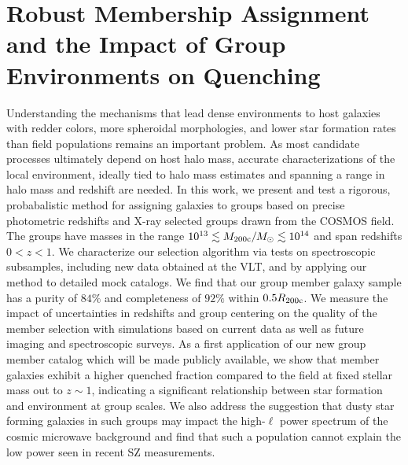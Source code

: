  \newcommand{\eg}{{e.g.}}
 \newcommand{\cf}{{c.f.}}
 \newcommand{\ie}{{i.e.}}
 \newcommand{\etc}{{etc.}}
 \newcommand{\sn}{S{\rm /}N}
 \newcommand{\rmd}{{\rm d}}
 \newcommand{\Msol}{\mbox{$M_{\odot}$}}
 \newcommand{\msun}{\mbox{$M_{\odot}$}}
 \newcommand{\Msun}{\mbox{${\bf M_{\odot} }$}}
 \newcommand{\Lsol}{\mbox{$L_{\odot}$}}
 \newcommand{\lsun}{\mbox{$L_{\odot}$}}
 \newcommand{\ergsec}{\mbox{erg s$^{-1}$}}
 \newcommand{\rvir}{\mbox{$R_{200\rm{c}}$}}
 \newcommand{\mvir}{\mbox{$M_{200\rm{c}}$}}
\newcommand{\zp}{\mbox{$z_{\rm p}$}}
 \newcommand{\zs}{\mbox{$z_{\rm s}$}}
\newcommand{\zG}{\mbox{$z_{\rm G}$}}
\newcommand{\pz}{\mbox{$\mathcal{P}(z)$}}
\newcommand{\flux}{erg cm$^{-2}$ s$^{-1}$ }
\newcommand{\nuvr}{{$(\rm{NUV} - r^+)$ }}

\chapter{Robust Membership Assignment and 
the Impact of Group Environments on Quenching}

\label{chap:catalog}

Understanding the mechanisms that lead dense environments to host
galaxies with redder colors, more spheroidal morphologies, and lower
star formation rates than field populations remains an important
problem. As most candidate processes ultimately depend on host halo
mass, accurate characterizations of the local environment, ideally
tied to halo mass estimates and spanning a range in halo mass and
redshift are needed.  In this work, we present and test a rigorous,
probabalistic method for assigning galaxies to groups based on precise
photometric redshifts and X-ray selected groups drawn from the COSMOS
field.  The groups have masses in the range $10^{13} \lesssim
M_{200\rm{c}}/M_{\odot} \lesssim 10^{14}$ and span redshifts
$0<z<1$. We characterize our selection algorithm via tests on
spectroscopic subsamples, including new data obtained at the VLT, and
by applying our method to detailed mock catalogs.  We find 
that our group member galaxy sample has a purity of $84\%$ and
completeness of $92\%$ within $0.5\rvir$. We measure the impact of
uncertainties in redshifts and group centering on the quality of the
member selection with simulations based on current data as well as
future imaging and spectroscopic surveys. As a first application of
our new group member catalog which will be made publicly available, we
show that member galaxies exhibit a higher quenched fraction compared
to the field at fixed stellar mass out to $z \sim 1$, indicating a
significant relationship between star formation and environment at
group scales.  We also address the suggestion that dusty star forming
galaxies in such groups may impact the high-$\ell$ power spectrum of
the cosmic microwave background and find that such a population cannot
explain the low power seen in recent SZ measurements. 
 

